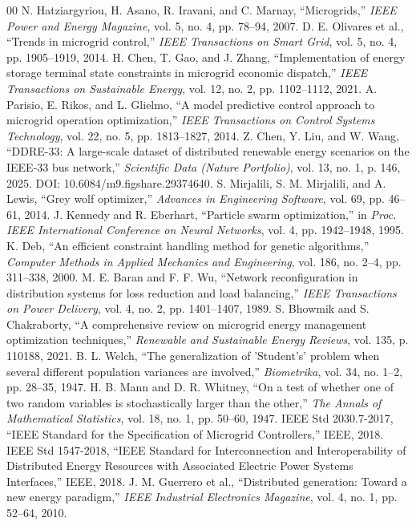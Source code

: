 \documentclass[conference]{IEEEtran}
\begin{document}
\begin{thebibliography}{00}
 N. Hatziargyriou, H. Asano, R. Iravani, and C. Marnay, ``Microgrids,'' \textit{IEEE Power and Energy Magazine}, vol. 5, no. 4, pp. 78--94, 2007.
 D. E. Olivares et al., ``Trends in microgrid control,'' \textit{IEEE Transactions on Smart Grid}, vol. 5, no. 4, pp. 1905--1919, 2014.
 H. Chen, T. Gao, and J. Zhang, ``Implementation of energy storage terminal state constraints in microgrid economic dispatch,'' \textit{IEEE Transactions on Sustainable Energy}, vol. 12, no. 2, pp. 1102--1112, 2021.
 A. Parisio, E. Rikos, and L. Glielmo, ``A model predictive control approach to microgrid operation optimization,'' \textit{IEEE Transactions on Control Systems Technology}, vol. 22, no. 5, pp. 1813--1827, 2014.
 Z. Chen, Y. Liu, and W. Wang, ``DDRE-33: A large-scale dataset of distributed renewable energy scenarios on the IEEE-33 bus network,'' \textit{Scientific Data (Nature Portfolio)}, vol. 13, no. 1, p. 146, 2025. DOI: 10.6084/m9.figshare.29374640.
 S. Mirjalili, S. M. Mirjalili, and A. Lewis, ``Grey wolf optimizer,'' \textit{Advances in Engineering Software}, vol. 69, pp. 46--61, 2014.
 J. Kennedy and R. Eberhart, ``Particle swarm optimization,'' in \textit{Proc. IEEE International Conference on Neural Networks}, vol. 4, pp. 1942--1948, 1995.
 K. Deb, ``An efficient constraint handling method for genetic algorithms,'' \textit{Computer Methods in Applied Mechanics and Engineering}, vol. 186, no. 2--4, pp. 311--338, 2000.
 M. E. Baran and F. F. Wu, ``Network reconfiguration in distribution systems for loss reduction and load balancing,'' \textit{IEEE Transactions on Power Delivery}, vol. 4, no. 2, pp. 1401--1407, 1989.
 S. Bhowmik and S. Chakraborty, ``A comprehensive review on microgrid energy management optimization techniques,'' \textit{Renewable and Sustainable Energy Reviews}, vol. 135, p. 110188, 2021.
 B. L. Welch, ``The generalization of 'Student's' problem when several different population variances are involved,'' \textit{Biometrika}, vol. 34, no. 1--2, pp. 28--35, 1947.
 H. B. Mann and D. R. Whitney, ``On a test of whether one of two random variables is stochastically larger than the other,'' \textit{The Annals of Mathematical Statistics}, vol. 18, no. 1, pp. 50--60, 1947.
 IEEE Std 2030.7-2017, ``IEEE Standard for the Specification of Microgrid Controllers,'' IEEE, 2018.
 IEEE Std 1547-2018, ``IEEE Standard for Interconnection and Interoperability of Distributed Energy Resources with Associated Electric Power Systems Interfaces,'' IEEE, 2018.
 J. M. Guerrero et al., ``Distributed generation: Toward a new energy paradigm,'' \textit{IEEE Industrial Electronics Magazine}, vol. 4, no. 1, pp. 52--64, 2010.
\end{thebibliography}
\end{document}

